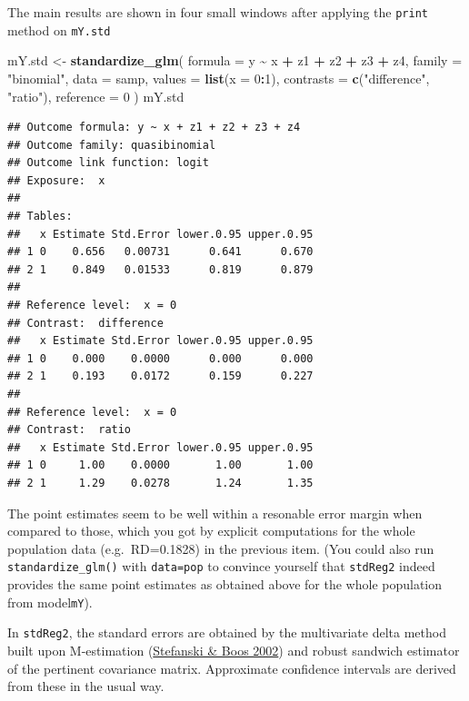 \documentclass[
]{book}
\newenvironment{Shaded}{\begin{snugshade}}{\end{snugshade}}
\newcommand{\AttributeTok}[1]{\textcolor[rgb]{0.13,0.29,0.53}{#1}}
\newcommand{\DecValTok}[1]{\textcolor[rgb]{0.00,0.00,0.81}{#1}}
\newcommand{\FunctionTok}[1]{\textcolor[rgb]{0.13,0.29,0.53}{\textbf{#1}}}
\newcommand{\NormalTok}[1]{#1}
\newcommand{\OtherTok}[1]{\textcolor[rgb]{0.56,0.35,0.01}{#1}}
\newcommand{\SpecialCharTok}[1]{\textcolor[rgb]{0.81,0.36,0.00}{\textbf{#1}}}
\newcommand{\StringTok}[1]{\textcolor[rgb]{0.31,0.60,0.02}{#1}}
\theoremstyle{definition}
\theoremstyle{definition}
\theoremstyle{definition}
\theoremstyle{definition}
\theoremstyle{remark}
\begin{document}
The main results are shown in four small windows
after applying the \texttt{print} method on \texttt{mY.std}

\begin{Shaded}
\begin{Highlighting}[]
\NormalTok{mY.std }\OtherTok{\textless{}{-}} \FunctionTok{standardize\_glm}\NormalTok{(}
 \AttributeTok{formula =}\NormalTok{ y }\SpecialCharTok{\textasciitilde{}}\NormalTok{ x }\SpecialCharTok{+}\NormalTok{ z1 }\SpecialCharTok{+}\NormalTok{ z2 }\SpecialCharTok{+}\NormalTok{ z3 }\SpecialCharTok{+}\NormalTok{ z4,}
 \AttributeTok{family =} \StringTok{"binomial"}\NormalTok{,}
 \AttributeTok{data =}\NormalTok{ samp,}
 \AttributeTok{values =} \FunctionTok{list}\NormalTok{(}\AttributeTok{x =} \DecValTok{0}\SpecialCharTok{:}\DecValTok{1}\NormalTok{),}
 \AttributeTok{contrasts =} \FunctionTok{c}\NormalTok{(}\StringTok{"difference"}\NormalTok{, }\StringTok{"ratio"}\NormalTok{),}
 \AttributeTok{reference =} \DecValTok{0}
\NormalTok{)}
\NormalTok{mY.std}
\end{Highlighting}
\end{Shaded}

\begin{verbatim}
## Outcome formula: y ~ x + z1 + z2 + z3 + z4
## Outcome family: quasibinomial 
## Outcome link function: logit 
## Exposure:  x 
## 
## Tables: 
##   x Estimate Std.Error lower.0.95 upper.0.95
## 1 0    0.656   0.00731      0.641      0.670
## 2 1    0.849   0.01533      0.819      0.879
## 
## Reference level:  x = 0 
## Contrast:  difference 
##   x Estimate Std.Error lower.0.95 upper.0.95
## 1 0    0.000    0.0000      0.000      0.000
## 2 1    0.193    0.0172      0.159      0.227
## 
## Reference level:  x = 0 
## Contrast:  ratio 
##   x Estimate Std.Error lower.0.95 upper.0.95
## 1 0     1.00    0.0000       1.00       1.00
## 2 1     1.29    0.0278       1.24       1.35
\end{verbatim}

The point estimates seem to be well within a resonable error margin when
compared to those, which you got by explicit computations for the whole
population data (e.g.~RD=0.1828) in the previous item. (You could also
run \texttt{standardize\_glm()} with \texttt{data=pop} to convince yourself that
\texttt{stdReg2} indeed provides the same point estimates as obtained above
for the whole population from model\texttt{mY}).

In \texttt{stdReg2}, the standard errors are obtained by the multivariate delta
method built upon M-estimation (\href{https://doi.org/10.1198/000313002753631330}{Stefanski \& Boos
2002}) and robust sandwich
estimator of the pertinent covariance matrix. Approximate confidence
intervals are derived from these in the usual way.
\end{document}
